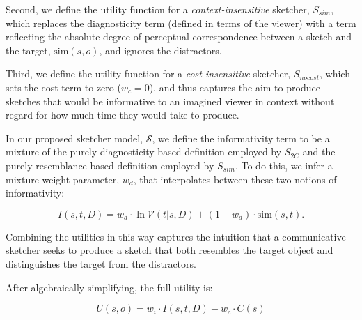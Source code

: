 \documentclass[9pt,twocolumn,twoside]{pnas-new}
\begin{document}
Second, we define the utility function for a \textit{context-insensitive} sketcher, $S_{sim}$, which replaces the diagnosticity term (defined in terms of the viewer) with a  term reflecting the absolute degree of perceptual correspondence between a sketch and the target, $\textrm{sim}(s,o)$, and ignores the distractors. 

Third, we define the utility function for a \textit{cost-insensitive} sketcher, $S_{nocost}$, which sets the cost term to zero ($w_c=0$), and thus captures the aim to produce sketches that would be informative to an imagined viewer in context without regard for how much time they would take to produce. 

In our proposed sketcher model, $\mathcal{S}$, we define the informativity term to be a mixture of the purely diagnosticity-based definition employed by $S_{2C}$ and the purely resemblance-based definition employed by $S_{sim}$. 
To do this, we infer a mixture weight parameter, $w_{d}$, that interpolates between these two notions of informativity: 

\begin{equation} \label{prag_interpolation}
I(s,t,D) = w_{d} \cdot \ln \mathcal{V}(t|s,D) + (1-w_{d}) \cdot \textrm{sim}(s,t). 
\end{equation} 

Combining the utilities in this way captures the intuition that a communicative sketcher seeks to produce a sketch that both resembles the target object and distinguishes the target from the distractors.

After algebraically simplifying, the full utility is:

\begin{equation}
U(s,o) =  w_i \cdot  I(s,t,D) - w_c \cdot C(s)
\end{equation}
\end{document}
